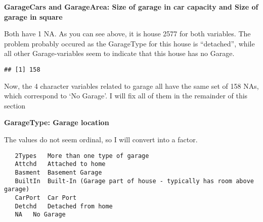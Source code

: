 \documentclass[]{article}
\newenvironment{Shaded}{\begin{snugshade}}{\end{snugshade}}
\newcommand{\CommentTok}[1]{\textcolor[rgb]{0.56,0.35,0.01}{\textit{#1}}}
\newcommand{\DecValTok}[1]{\textcolor[rgb]{0.00,0.00,0.81}{#1}}
\newcommand{\KeywordTok}[1]{\textcolor[rgb]{0.13,0.29,0.53}{\textbf{#1}}}
\newcommand{\NormalTok}[1]{#1}
\newcommand{\OperatorTok}[1]{\textcolor[rgb]{0.81,0.36,0.00}{\textbf{#1}}}
\newcommand{\OtherTok}[1]{\textcolor[rgb]{0.56,0.35,0.01}{#1}}
\newcommand{\StringTok}[1]{\textcolor[rgb]{0.31,0.60,0.02}{#1}}
\begin{document}
\textbf{GarageCars and GarageArea: Size of garage in car capacity and
Size of garage in square}

Both have 1 NA. As you can see above, it is house 2577 for both
variables. The problem probably occured as the GarageType for this house
is ``detached'', while all other Garage-variables seem to indicate that
this house has no Garage.

\begin{Shaded}
\end{Shaded}

\begin{verbatim}
## [1] 158
\end{verbatim}

Now, the 4 character variables related to garage all have the same set
of 158 NAs, which correspond to `No Garage'. I will fix all of them in
the remainder of this section

\textbf{GarageType: Garage location}

The values do not seem ordinal, so I will convert into a factor.

\begin{verbatim}
   2Types   More than one type of garage
   Attchd   Attached to home
   Basment  Basement Garage
   BuiltIn  Built-In (Garage part of house - typically has room above garage)
   CarPort  Car Port
   Detchd   Detached from home
   NA   No Garage
\end{verbatim}

\begin{Shaded}
\end{Shaded}
\end{document}
